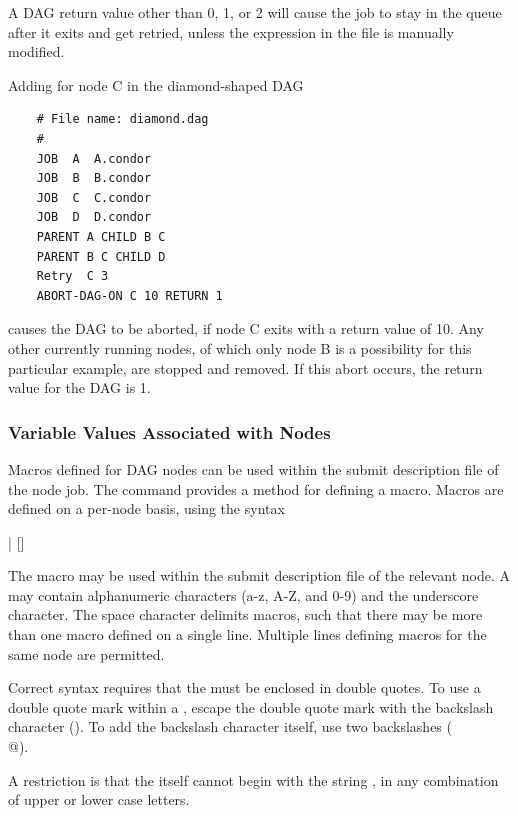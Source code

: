 A DAG return value other than 0, 1, or 2 will cause the
 job to stay in the queue after it exits
and get retried, unless the  expression in the
 file is manually modified.

Adding  for node C in the diamond-shaped
DAG
\footnotesize
\begin{verbatim}
    # File name: diamond.dag
    #
    JOB  A  A.condor 
    JOB  B  B.condor 
    JOB  C  C.condor	
    JOB  D  D.condor
    PARENT A CHILD B C
    PARENT B C CHILD D
    Retry  C 3
    ABORT-DAG-ON C 10 RETURN 1
\end{verbatim}
\normalsize

causes the DAG to be aborted, if node C exits with a return value of 10.
Any other currently running nodes, 
of which only node B is a possibility for this particular example, 
are stopped and removed.
If this abort occurs, the return value for the DAG is 1.


\subsubsection{\label{dagman:VARS}Variable Values Associated with Nodes}

Macros defined for DAG nodes can be used within the submit description
file of the node job. 
The  command provides a method for defining a macro.
Macros are defined on a per-node basis, using the syntax

 | 
[]

The macro may be used within the
submit description file of the relevant node.  
A  may contain alphanumeric characters (a-z, A-Z, and 0-9)
and the underscore character.
The space character delimits macros,
such that there may be more than one macro defined on a single line.
Multiple lines defining macros for the same node are permitted.

Correct syntax requires that the  must be
enclosed in double quotes.
To use a double quote mark within a ,
escape the double quote mark with the backslash character (\verb@\@).
To add the backslash character itself, use two backslashes (\verb@\\@).

A restriction is that the  itself cannot begin with the string
,
in any combination of upper or lower case letters.


